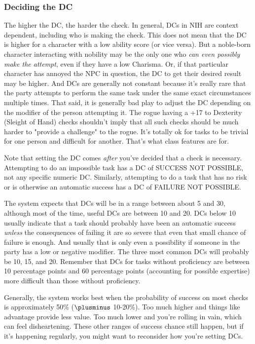\documentclass[10pt,twoside,openany,bg=none]{dndbook}
\begin{document}
\subsubsection{Deciding the DC}
The higher the DC, the harder the check. In general, DCs in NIH are context dependent, including who is making the check. This does not mean that the DC is higher for a character with a low ability score (or vice versa). But a noble-born character interacting with nobility may be the only one who \textit{can even possibly make the attempt}, even if they have a low Charisma. Or, if that particular character has annoyed the NPC in question, the DC to get their desired result may be higher. And DCs are generally not constant because it's really rare that the party attempts to perform the same task under the same exact circumstances multiple times. That said, it is generally bad play to adjust the DC depending on the modifier of the person attempting it. The rogue having a +17 to Dexterity (Sleight of Hand) checks shouldn't imply that all such checks should be much harder to "provide a challenge" to the rogue. It's totally ok for tasks to be trivial for one person and difficult for another. That's what class features are for.

Note that setting the DC comes \textit{after} you've decided that a check is necessary. Attempting to do an impossible task has a DC of SUCCESS NOT POSSIBLE, not any specific numeric DC. Similarly, attempting to do a task that has no risk or is otherwise an automatic success has a DC of FAILURE NOT POSSIBLE.

The system expects that DCs will be in a range between about 5 and 30, although most of the time, useful DCs are between 10 and 20. DCs below 10 usually indicate that a task should probably have been an automatic success \textit{unless} the consequences of failing it are so severe that even that small chance of failure is enough. And usually that is only even a possibility if someone in the party has a low or negative modifier. The three most common DCs will probably be 10, 15, and 20. Remember that DCs for tasks without proficiency are between 10 percentage points and 60 percentage points (accounting for possible expertise) more difficult than those without proficiency.

Generally, the system works best when the probability of success on most checks is approximately 50\% ($\plusminus$ 10-20\%). Too much higher and things like advantage provide less value. Too much lower and you're rolling in vain, which can feel disheartening. These other ranges of success chance still happen, but if it's happening regularly, you might want to reconsider how you're setting DCs.
\end{document}
